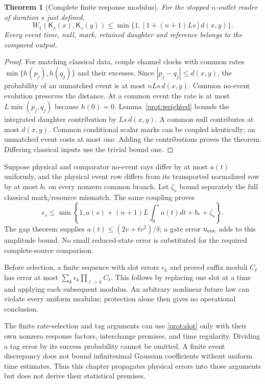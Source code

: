 \documentclass[11pt,oneside,openany]{book}
\newtheorem{theorem}{Theorem}[chapter]
\theoremstyle{definition}
\theoremstyle{remark}\newtheorem{remark}[theorem]{Remark}
\begin{document}
\begin{theorem}[Complete finite response modulus]
\label{prot:modulus}
For the stopped $n$-outlet reader of duration $s$ just defined,
\begin{equation}
 W_1(\mathsf K_s(x),\mathsf K_s(y))
       \le\min\{1,[1+(n+1)Ls]d(x,y)\}.
 \label{prot:modulusbound}
\end{equation}
Every event time, null, mark, retained daughter and reference belongs to the compared output.
\end{theorem}
\begin{proof}
For matching classical data, couple channel clocks with common rates $\min\{h(p_j),h(q_j)\}$ and their excesses. Since $|p_j-q_j|\le d(x,y)$, the probability of an unmatched event is at most $nLs\,d(x,y)$. Common no-event evolution preserves the distance. At a common event the rate is at most $L\min(p_j,q_j)$ because $h(0)=0$. Lemma~\ref{prot:weighted} bounds the integrated daughter contribution by $Ls\,d(x,y)$. A common null contributes at most $d(x,y)$. Common conditional scalar marks can be coupled identically; an unmatched event costs at most one. Adding the contributions proves the theorem. Differing classical inputs use the trivial bound one.
\end{proof}

Suppose physical and comparator no-event rays differ by at most $a(t)$ uniformly, and the physical event row differs from its transported normalized row by at most $b_*$ on every nonzero common branch. Let $\zeta_s$ bound separately the full classical mark/resource mismatch. The same coupling proves
\begin{equation}
 \epsilon_s\le\min\left\{1,
 a(s)+(n+1)L\int_0^sa(t)dt+b_*+\zeta_s\right\}.
 \label{prot:slot}
\end{equation}
The gap theorem supplies $a(t)\le(2v+tv^2)/\delta$; a gate error $u_{\rm enc}$ adds to this amplitude bound. No small reduced-state error is substituted for the required complete-source comparison.

Before selection, a finite sequence with slot errors $\epsilon_k$ and proved suffix moduli $C_\ell$ has error at most
$\sum_k\epsilon_k\prod_{\ell>k}C_\ell$. This follows by replacing one slot at a time and applying each subsequent modulus. An arbitrary nonlinear future law can violate every uniform modulus; protection alone then gives no operational conclusion.

The finite rate-selection and tag arguments can use \eqref{prot:slot} only with their own nonzero response factors, interchange premises, and time regularity. Dividing a tag error by its success probability cannot be omitted. A finite event discrepancy does not bound infinitesimal Gaussian coefficients without uniform time estimates. Thus this chapter propagates physical errors into those arguments but does not derive their statistical premises.
\end{document}
